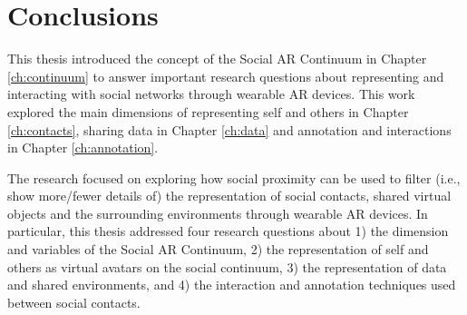 \chapter{Conclusions}
\label{ch:conclusions}





This thesis introduced the concept of the Social AR Continuum in Chapter \ref{ch:continuum} to answer important research questions about representing and interacting with social networks through wearable AR devices. This work explored the main dimensions of representing self and others in Chapter \ref{ch:contacts}, sharing data in Chapter \ref{ch:data} and annotation and interactions in Chapter \ref{ch:annotation}. 

The research focused on exploring how social proximity can be used to filter (i.e., show more/fewer details of) the representation of social contacts, shared virtual objects and the surrounding environments through wearable AR devices. In particular, this thesis addressed four research questions about 1) the dimension and variables of the Social AR Continuum, 2) the representation of self and others as virtual avatars on the social continuum, 3) the representation of data and shared environments, and 4) the interaction and annotation techniques used between social contacts.   

